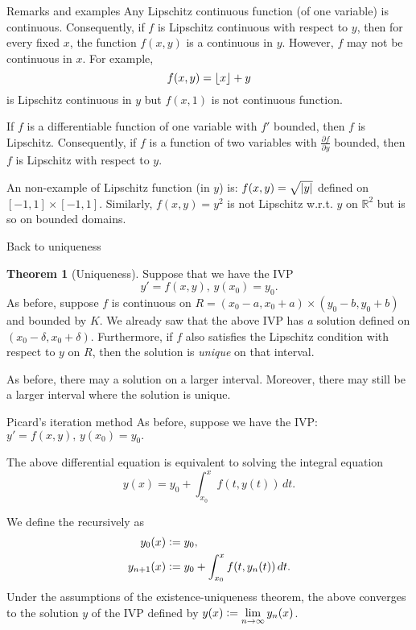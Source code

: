 \documentclass[dvipsnames]{beamer}
\theoremstyle{definition}
\newtheorem{thm}{Theorem}
\begin{document}
\begin{frame}{Remarks and examples}
  Any Lipschitz continuous function (of one variable) is continuous. \pause Consequently, if $f$ is Lipschitz continuous with respect to $y$, then for every fixed $x$, the function $f(x, y)$ is a continuous in $y$. \pause However, $f$ may not be continuous in $x$. \pause For example,
  \begin{equation*} 
    f(x, y) = \left\lfloor x \right\rfloor + y
  \end{equation*}
  is Lipschitz continuous in $y$ but $f(x, 1)$ is not continuous function. \pause

  If $f$ is a differentiable function of one variable with $f'$ bounded, then $f$ is Lipschitz. \pause Consequently, if $f$ is a function of two variables with $\frac{\partial f}{\partial y}$ bounded, then $f$ is Lipschitz with respect to $y$. \pause

  An non-example of Lipschitz function (in $y$) is: $f(x, y) = \sqrt{{\left\lvert y \right\lvert}}$ defined on $[-1, 1] \times [-1, 1]$. \pause Similarly, $f(x, y) = y^{2}$ is not Lipschitz w.r.t. $y$ on $\mathbb{R}^{2}$ but is so on bounded domains.
\end{frame}
\begin{frame}{Back to uniqueness}
  
  \begin{thm}[Uniqueness]
    Suppose that we have the IVP
    \begin{equation*} 
      y' = f(x, y),\, y(x_{0}) = y_{0}.
    \end{equation*} \pause
    As before, suppose $f$ is continuous on $R = (x_{0} - a, x_{0} + a) \times (y_{0} - b, y_{0} + b)$ and bounded by $K$. \pause We already saw that the above IVP has \emph{a} solution defined on $(x_{0} - \delta, x_{0} + \delta)$. \pause Furthermore, if $f$ also satisfies the Lipschitz condition with respect to $y$ on $R$, \pause then the solution is \emph{unique} on that interval.  
  \end{thm} \pause
  As before, there may a solution on a larger interval. \pause Moreover, there may still be a larger interval where the solution is unique.
\end{frame}
\begin{frame}{Picard's iteration method}
  As before, suppose we have the IVP: $y' = f(x, y),\, y(x_{0}) = y_{0}.$ \pause

  The above differential equation is equivalent to solving the integral equation
  \begin{equation*} 
    y(x) = y_{0} + \int_{x_{0}}^{x} f(t, y(t)) \,dt.
  \end{equation*} \pause

  We define the  recursively as \pause
  \begin{align*} 
    y_{0}(x) &\vcentcolon= y_{0}, \\
    y_{n + 1}(x) &\vcentcolon= y_{0} + \int_{x_{0}}^{x} f(t, y_{n}(t)) \,dt.
  \end{align*} \pause
  Under the assumptions of the existence-uniqueness theorem, the above converges to the solution $y$ of the IVP defined by $y(x) \vcentcolon= \displaystyle\lim_{n \to \infty} y_{n}(x)$.
\end{frame}
\end{document}
